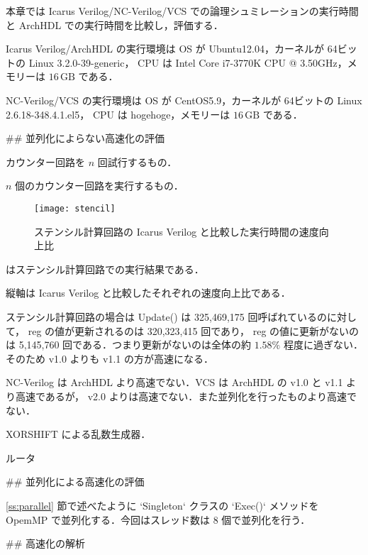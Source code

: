 本章では Icarus Verilog/NC-Verilog/VCS での論理シュミレーションの実行時間と
ArchHDL での実行時間を比較し，評価する．

Icarus Verilog/ArchHDL の実行環境は OS が Ubuntu12.04，カーネルが 64ビットの
Linux 3.2.0-39-generic， CPU は
Intel Core i7-3770K CPU @ 3.50GHz，メモリーは
$16\,\mathrm{GB}$ である．

NC-Verilog/VCS の実行環境は OS が CentOS5.9，カーネルが 64ビットの
Linux 2.6.18-348.4.1.el5， CPU は
hogehoge，メモリーは
$16\,\mathrm{GB}$ である．


## 並列化によらない高速化の評価

カウンター回路を $n$ 回試行するもの．

$n$ 個のカウンター回路を実行するもの．

\begin{figure}[t]
 \centering
 \texttt{[image: stencil]}
 \caption{ステンシル計算回路の Icarus Verilog と比較した実行時間の速度向上比}
 \label{fig:stencil}
\end{figure}

 はステンシル計算回路での実行結果である．

縦軸は Icarus Verilog と比較したそれぞれの速度向上比である．

ステンシル計算回路の場合は Update() は 325,469,175 回呼ばれているのに対して，
reg の値が更新されるのは 320,323,415 回であり，
reg の値に更新がないのは 5,145,760 回である．つまり更新がないのは全体の約
$1.58\%$ 程度に過ぎない．そのため v1.0 よりも v1.1 の方が高速になる．

NC-Verilog は ArchHDL より高速でない．VCS は ArchHDL の v1.0 と v1.1 より高速であるが， v2.0 よりは高速でない．また並列化を行ったものより高速でない．





XORSHIFT による乱数生成器．




ルータ





## 並列化による高速化の評価

\ref{ss:parallel} 節で述べたように `Singleton` クラスの `Exec()`
メソッドを OpemMP で並列化する．今回はスレッド数は 8 個で並列化を行う．







## 高速化の解析







